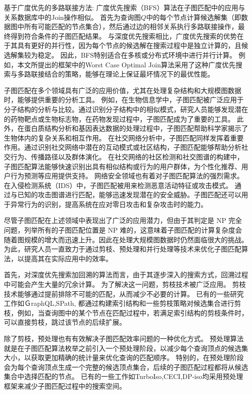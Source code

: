 基于广度优先的多路联接方法: 广度优先搜索（BFS）算法在子图匹配中的应用与关系数据库中的Join操作相似。
首先为查询图$Q$中的每个节点计算候选解集（即数据图中所有可能匹配的节点集合），然后通过边的相邻关系执行多路联接操作，最终得到符合条件的子图匹配结果。
与深度优先搜索相比，广度优先搜索的优势在于其具有更好的并行性，因为每个节点的候选解在搜索过程中是独立计算的，且候选解集较为稳定。
因此，BFS特别适合在多核或分布式环境中进行并行计算。
例如，本文所提出的框架中的Worst Case Optimal Join算法\cite{sm-bfs-DBLP:conf/focs/AtseriasGM08}采用了这种广度优先搜索与多路联接结合的策略，能够在理论上保证最坏情况下的最优性能。

子图匹配在多个领域具有广泛的应用价值，尤其在处理复杂结构和大规模图数据时，能够提供重要的分析工具。
例如，在生物信息学中，子图匹配被广泛应用于分子结构的分析与比较。通过识别分子结构中的相似模式，研究人员能够发现潜在的药物靶点或生物标志物，在药物发现过程中，子图匹配成为了重要的工具。
此外，在蛋白质结构分析和基因表达数据的处理过程中，子图匹配帮助科学家揭示了生物体内的复杂关系和相互作用。
在社交网络分析中，子图匹配同样发挥着重要作用。通过识别社交网络中潜在的互动模式或社区结构，子图匹配能够帮助分析社交行为、传播路径以及群体演化。
在社交网络的社区检测和社交图谱的构建中，子图匹配算法能够快速识别出具有相似结构或行为的用户群体，为个性化推荐、用户行为预测等应用提供支持。
网络安全领域也有着对子图匹配算法的强烈需求。在入侵检测系统（IDS）中，子图匹配被用来检测恶意活动特征或攻击模式。
通过与已知的攻击图谱进行匹配，能够迅速发现潜在的安全威胁。子图匹配还可以用于异常行为的识别，提高系统在应对零日攻击和复杂攻击时的能力。

尽管子图匹配在上述领域中表现出了广泛的应用潜力，但由于其判定是 NP 完全问题，列举所有的子图匹配位置是 NP 难的，这意味着子图匹配的计算复杂度会随着图规模的增大而迅速上升。因此在处理大规模图数据时仍然面临很大的挑战。
为此，研究人员一直致力于通过剪枝、预处理和并行处理等技术来优化子图匹配算法，以提高其在实际应用中的效率。

首先，对深度优先搜索加回溯的算法而言，由于其逐步深入的搜索方式，回溯过程中可能会产生大量的冗余计算。
为了解决这一问题，剪枝技术被广泛应用。
剪枝技术能够通过提前排除不可能的匹配，从而减少不必要的计算。
已有的一些研究工作如ＧraphQL\cite{sm-GraphQL-DBLP:series/ads/HeS10},SPath\cite{sm-spath-DBLP:journals/pvldb/ZhaoH10},
都通过构建索引结构和一些剪枝策略对候选集合进行剪枝，例如，当查询图中的某个节点在匹配过程中，若满足索引结构的剪枝条件时，可以直接剪枝，跳过该节点的后续扩展。

除了剪枝，预处理也有有效解决子图匹配效率问题的一种优化方式。 
预处理算法就是在子图匹配算法枚举之前引入一个预处理阶段，以减少每个查询顶点的候选集大小，以获取更加精确的统计量来优化查询的匹配顺序。
特别的，在预处理阶段会为每个查询顶点生成一个完整的候选顶点集合，后续的子图匹配过程都将从候选集合中选择匹配的节点。
已有的一些工作如TurboIso\cite{sm-turbo-iso-DBLP:conf/sigmod/HanLL13},CECI\cite{sm-ceci-DBLP:conf/sigmod/BhattaraiLH19},DP-iso\cite{sm-dp-iso-DBLP:conf/sigmod/HanKGPH19}均采用预处理框架来减少子图匹配过程中的搜索空间。

